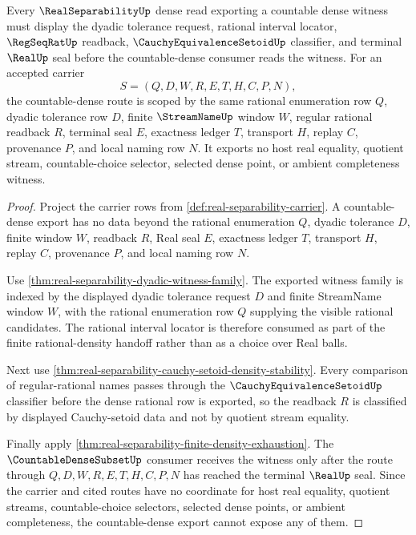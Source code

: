 \begin{theorem}
\label{thm:real-separability-dyadic-countable-dense-scope}
Every $\RealSeparabilityUp$ dense read exporting a countable dense witness must display the dyadic tolerance request, rational interval locator, $\RegSeqRatUp$ readback, $\CauchyEquivalenceSetoidUp$ classifier, and terminal $\RealUp$ seal before the countable-dense consumer reads the witness. For an accepted carrier
$$
S=(Q,D,W,R,E,T,H,C,P,N),
$$
the countable-dense route is scoped by the same rational enumeration row $Q$, dyadic tolerance row $D$, finite $\StreamNameUp$ window $W$, regular rational readback $R$, terminal seal $E$, exactness ledger $T$, transport $H$, replay $C$, provenance $P$, and local naming row $N$. It exports no host real equality, quotient stream, countable-choice selector, selected dense point, or ambient completeness witness.
\end{theorem}
\begin{proof}
Project the carrier rows from \autoref{def:real-separability-carrier}. A countable-dense export has no data beyond the rational enumeration $Q$, dyadic tolerance $D$, finite window $W$, readback $R$, Real seal $E$, exactness ledger $T$, transport $H$, replay $C$, provenance $P$, and local naming row $N$.

Use \autoref{thm:real-separability-dyadic-witness-family}. The exported witness family is indexed by the displayed dyadic tolerance request $D$ and finite StreamName window $W$, with the rational enumeration row $Q$ supplying the visible rational candidates. The rational interval locator is therefore consumed as part of the finite rational-density handoff rather than as a choice over Real balls.

Next use \autoref{thm:real-separability-cauchy-setoid-density-stability}. Every comparison of regular-rational names passes through the $\CauchyEquivalenceSetoidUp$ classifier before the dense rational row is exported, so the readback $R$ is classified by displayed Cauchy-setoid data and not by quotient stream equality.

Finally apply \autoref{thm:real-separability-finite-density-exhaustion}. The $\CountableDenseSubsetUp$ consumer receives the witness only after the route through $Q,D,W,R,E,T,H,C,P,N$ has reached the terminal $\RealUp$ seal. Since the carrier and cited routes have no coordinate for host real equality, quotient streams, countable-choice selectors, selected dense points, or ambient completeness, the countable-dense export cannot expose any of them.
\end{proof}

